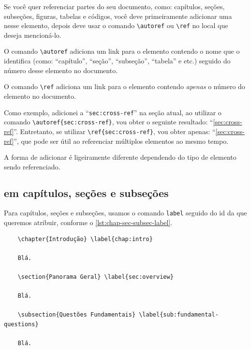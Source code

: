 Se você quer referenciar partes do seu documento, como: capítulos, seções, subseções, figuras, tabelas e códigos, você deve primeiramente adicionar uma  nesse elemento, depois deve usar o comando \texttt{\textbackslash{}autoref} ou \texttt{\textbackslash{}ref} no local que deseja mencioná-lo.

O comando \texttt{\textbackslash{}autoref} adiciona um link para o elemento contendo o nome que o identifica (como: \enquote{capítulo}, \enquote{seção}, \enquote{subseção}, \enquote{tabela} e etc.) seguido do número desse elemento no documento.

O comando \texttt{\textbackslash{}ref} adiciona um link para o elemento contendo \emph{apenas} o número do elemento no documento.

Como exemplo, adicionei a  \enquote{\texttt{sec:cross-ref}} na seção atual, ao utilizar o comando \texttt{\textbackslash{}autoref\{sec:cross-ref\}}, vou obter o seguinte resultado: \enquote{\autoref{sec:cross-ref}}.
Entretanto, se utilizar \texttt{\textbackslash{}ref\{sec:cross-ref\}}, vou obter apenas: \enquote{\ref{sec:cross-ref}}, que pode ser útil ao referenciar múltiplos elementos ao mesmo tempo.

A forma de adicionar  é ligeiramente diferente dependendo do tipo de elemento sendo referenciado.

\subsection{\texorpdfstring{}{Labels} em capítulos, seções e subseções}

Para capítulos, seções e subseções, usamos o comando \texttt{label} seguido do id da  que queremos atribuir, conforme o \autoref{lst:chap-sec-subsec-label}.

\begin{listing}[htb]
  \begin{verbatim}
    \chapter{Introdução} \label{chap:intro}

    Blá.

    \section{Panorama Geral} \label{sec:overview}

    Blá.

    \subsection{Questões Fundamentais} \label{sub:fundamental-questions}

    Blá.
  \end{verbatim}
  \caption{Atribuição de  em capítulos, seções e subseções}
  \label{lst:chap-sec-subsec-label}
\end{listing}

